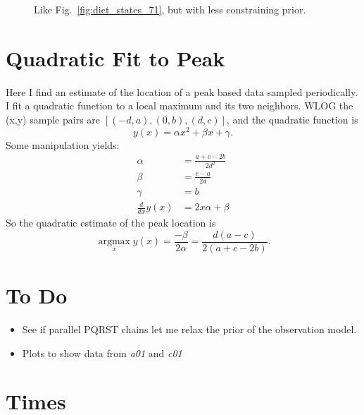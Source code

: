 \documentclass[12pt]{article}
\newcommand{\argmax}{\operatorname*{argmax}}
\begin{document}
\begin{figure}
  \centering
  \caption{Like Fig.~\ref{fig:dict_states_71}, but with less
    constraining prior.}
  \label{fig:bad_dict_71}
\end{figure}

\section{Quadratic Fit to Peak}
\label{sec:quadratic}

Here I find an estimate of the location of a peak based data sampled
periodically.  I fit a quadratic function to a local maximum and its
two neighbors.  WLOG the (x,y) sample pairs are $[(-d,a), (0,b),
(d,c)]$, and the quadratic function is
\begin{equation*}
  y(x) = \alpha x^2 + \beta x + \gamma.
\end{equation*}
Some manipulation yields:
\begin{align*}
  \alpha &= \frac{a+c-2b}{2d^2} \\
  \beta &= \frac{c-a}{2d} \\
  \gamma &= b \\
  \frac{d}{dx} y(x) &= 2x\alpha + \beta
\end{align*}
So the quadratic estimate of the peak location is
\begin{equation*}
  \argmax_x y(x) = \frac{-\beta}{2\alpha} = \frac{d(a-c)}{2(a+c-2b)}.
\end{equation*}

\section{To Do}
\label{sec:todo}

\begin{itemize}
\item See if parallel PQRST chains let me relax the prior of the
  observation model.
\item Plots to show data from \emph{a01} and \emph{c01}
\end{itemize}
\section{Times}
\label{sec:times}
\end{document}
